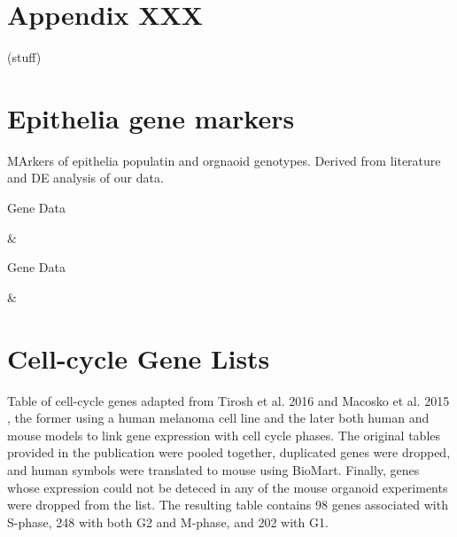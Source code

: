{}

\appendix
\chapter{Appendix XXX}
\label{appendix:XXX}
(stuff)


\chapter{Epithelia gene markers}

MArkers of epithelia populatin and orgnaoid genotypes. Derived from literature and DE analysis of our data.

\begin{table}
  \centering
  \caption{Gene Data}
  \label{tab:epimarkers}
  {\csvcoli & \csvcolii}
\end{table}
\begin{table}
  \centering
  \caption{Gene Data}
  \label{tab:epimarkers}
  {\csvcoli & \csvcolii}
\end{table}

\chapter{Cell-cycle Gene Lists}
\label{appendix:cycle}
Table of cell-cycle genes adapted from Tirosh et al. 2016 \cite{tirosh_dissecting_2016} and Macosko et al. 2015 \cite{macosko_highly_2015}, the former using a human melanoma cell line and the later both human and mouse models to link gene expression with cell cycle phases. The original tables provided in the publication were pooled together, duplicated genes were dropped, and human symbols were translated to mouse using BioMart. Finally, genes whose expression could not be deteced in any of the mouse organoid experiments were dropped from the list. The resulting table contains 98 genes associated with S-phase, 248 with both G2 and M-phase, and 202 with G1.

